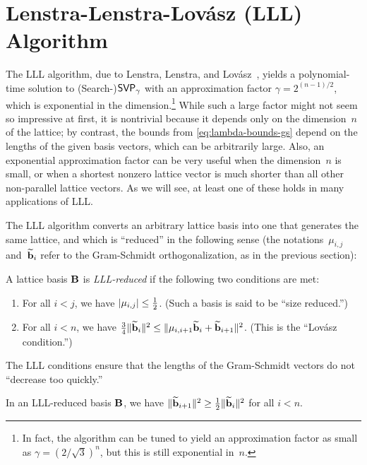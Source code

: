 \documentclass[11pt]{article}
\begin{document}
\section{Lenstra-Lenstra-Lov{\'a}sz (LLL) Algorithm}
\label{sec:lll-alg}

The LLL algorithm, due to Lenstra, Lenstra, and
Lov{\'a}sz~\cite{lenstra82:_factor}, yields a polynomial-time solution
to (Search-)$\mathsf{SVP}_{\gamma}$ with an approximation factor
$\gamma = 2^{(n-1)/2}$, which is exponential in the
dimension.\footnote{In fact, the algorithm can be tuned to yield an
  approximation factor as small as $\gamma = (2/\sqrt{3})^{n}$, but
  this is still exponential in~$n$.} While such a large factor might
not seem so impressive at first, it is nontrivial because it depends
only on the dimension~$n$ of the lattice; by contrast, the bounds from
\cref{eq:lambda-bounds-gs} depend on the lengths of the given basis
vectors, which can be arbitrarily large. Also, an exponential
approximation factor can be very useful when the dimension~$n$ is
small, or when a shortest nonzero lattice vector is much shorter than
all other non-parallel lattice vectors. As we will see, at least one
of these holds in many applications of LLL.

The LLL algorithm converts an arbitrary lattice basis into one that
generates the same lattice, and which is ``reduced'' in the following
sense (the notations~$\mu_{i,j}$ and~$\widetilde{\mathbf{b}}_{i}$ refer to the
Gram-Schmidt orthogonalization, as in the previous section):

\begin{definition}
  \label{def:lll}
  A lattice basis $\mathbf{B}$ is \emph{LLL-reduced} if the following two
  conditions are met:
  \begin{enumerate}
  \item For all $i < j$, we have $\lvert\mu_{i,j}\rvert \leq \frac{1}{2}$.
    \hfill (Such a basis is said to be ``size reduced.'')
    
  \item For all $i < n$, we have
    $\frac{3}{4}\lVert \widetilde{\mathbf{b}}_i\rVert^2 \leq
    \lVert\mu_{i,i+1}\widetilde{\mathbf{b}}_i + \widetilde{\mathbf{b}}_{i+1}\rVert^2$.
    \hfill (This is the ``Lov{\'a}sz condition.'')
  \end{enumerate}
\end{definition}

\noindent The LLL conditions ensure that the lengths of the
Gram-Schmidt vectors do not ``decrease too quickly.''

\begin{lemma}
  \label{lem:lll-gs}
  In an LLL-reduced basis $\mathbf{B}$, we have
  $\lVert\widetilde{\mathbf{b}}_{i+1}\rVert^{2} \geq \frac12
  \lVert\widetilde{\mathbf{b}}_{i}\rVert^{2}$ for all $i < n$.
\end{lemma}
\end{document}
